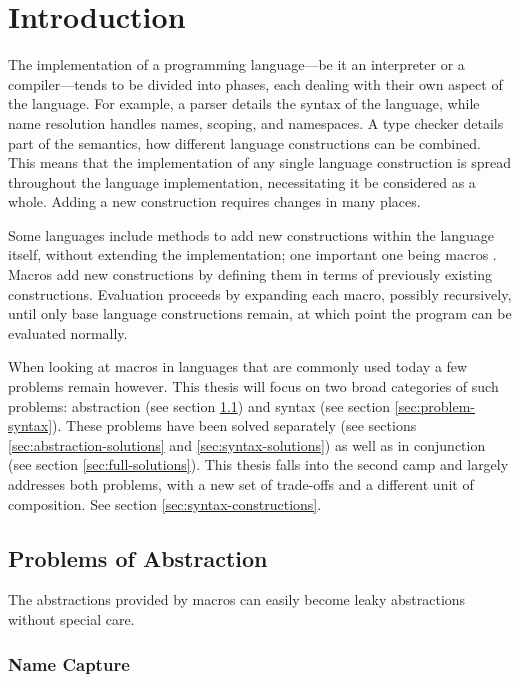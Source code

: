 \documentclass{kththesis}
\begin{document}
\chapter{Introduction} \label{sec:introduction}

The implementation of a programming language---be it an interpreter or a compiler---tends to be divided into phases, each dealing with their own aspect of the language. For example, a parser details the syntax of the language, while name resolution handles names, scoping, and namespaces. A type checker details part of the semantics, how different language constructions can be combined. This means that the implementation of any single language construction is spread throughout the language implementation, necessitating it be considered as a whole. Adding a new construction requires changes in many places.

Some languages include methods to add new constructions within the language itself, without extending the implementation; one important one being macros \cite{Flatt2010Reference:-Rack,Hickey2008The-Clojure-pro,Matsakis2014The-rust-langua}. Macros add new constructions by defining them in terms of previously existing constructions. Evaluation proceeds by expanding each macro, possibly recursively, until only base language constructions remain, at which point the program can be evaluated normally.

When looking at macros in languages that are commonly used today a few problems remain however. This thesis will focus on two broad categories of such problems: abstraction (see section \ref{sec:problem-abstraction}) and syntax (see section \ref{sec:problem-syntax}). These problems have been solved separately (see sections \ref{sec:abstraction-solutions} and \ref{sec:syntax-solutions}) as well as in conjunction (see section \ref{sec:full-solutions}). This thesis falls into the second camp and largely addresses both problems, with a new set of trade-offs and a different unit of composition. See section \ref{sec:syntax-constructions}.

\section{Problems of Abstraction} \label{sec:problem-abstraction}

The abstractions provided by macros can easily become leaky abstractions without special care.

\subsection{Name Capture}
\end{document}

